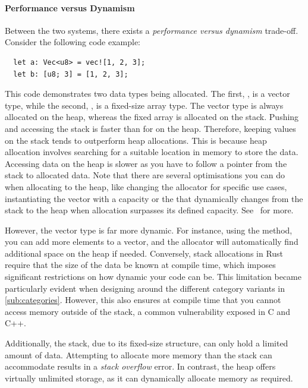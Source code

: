 \documentclass[11pt]{report}
\theoremstyle{definition}
\theoremstyle{plain}
\begin{document}
\paragraph{Performance versus Dynamism}

Between the two systems, there exists a \textit{performance versus dynamism} trade-off. Consider the following code example:

\begin{verbatim}
  let a: Vec<u8> = vec![1, 2, 3];
  let b: [u8; 3] = [1, 2, 3];
\end{verbatim}

This code demonstrates two data types being allocated. The first, , is a vector type, while the second, , is a fixed-size array type. The vector type is always allocated on the heap, whereas the fixed array is allocated on the stack. Pushing  and accessing the stack is faster than for on the heap. Therefore, keeping values on the stack tends to outperform heap allocations. This is because heap allocation involves searching for a suitable location in memory to store the data. Accessing data on the heap is slower as you have to follow a pointer from the stack to allocated data. Note that there are several optimisations you can do when allocating to the heap, like changing the allocator for specific use cases, instantiating the vector with a capacity or the  that dynamically changes from the stack to the heap when allocation surpasses its defined capacity. See~\cite{rustlangPerformanceBook} for more.

However, the vector type is far more dynamic. For instance, using the  method, you can add more elements to a vector, and the allocator will automatically find additional space on the heap if needed. Conversely, stack allocations in Rust require that the size of the data be known at compile time, which imposes significant restrictions on how dynamic your code can be. This limitation became particularly evident when designing around the different category variants in \autoref{sub:categories}. However, this also ensures at compile time that you cannot access memory outside of the stack, a common vulnerability exposed in C and C++.

Additionally, the stack, due to its fixed-size structure, can only hold a limited amount of data. Attempting to allocate more memory than the stack can accommodate results in a \textit{stack overflow} error. In contrast, the heap offers virtually unlimited storage, as it can dynamically allocate memory as required.
\end{document}
